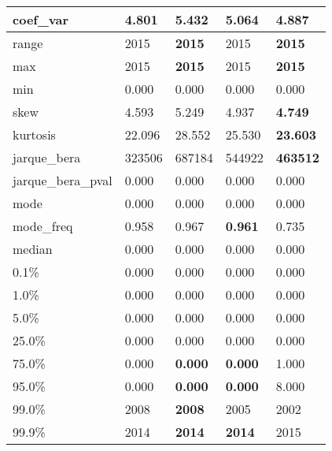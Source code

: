 \begin{table}[H]
\begin{tabular}{|l|m{10em}|m{10em}|m{10em}|m{10em}|}
\hline coef\_var & 4.801 & \cellcolor[rgb]{0.9, 0.54, 0.52} 5.432 & 5.064 & \bfseries 4.887 \\
\hline range & 2015 & \bfseries 2015 & \cellcolor[rgb]{0.9, 0.54, 0.52} 2015 & \bfseries 2015 \\
\hline max & 2015 & \bfseries 2015 & \cellcolor[rgb]{0.9, 0.54, 0.52} 2015 & \bfseries 2015 \\
\hline min & 0.000 & 0.000 & 0.000 & 0.000 \\
\hline skew & 4.593 & \cellcolor[rgb]{0.9, 0.54, 0.52} 5.249 & 4.937 & \bfseries 4.749 \\
\hline kurtosis & 22.096 & \cellcolor[rgb]{0.9, 0.54, 0.52} 28.552 & 25.530 & \bfseries 23.603 \\
\hline jarque\_bera & 323506 & \cellcolor[rgb]{0.9, 0.54, 0.52} 687184 & 544922 & \bfseries 463512 \\
\hline jarque\_bera\_pval & 0.000 & 0.000 & 0.000 & 0.000 \\
\hline mode & 0.000 & 0.000 & 0.000 & 0.000 \\
\hline mode\_freq & 0.958 & 0.967 & \bfseries 0.961 & \cellcolor[rgb]{0.9, 0.54, 0.52} 0.735 \\
\hline median & 0.000 & 0.000 & 0.000 & 0.000 \\
\hline 0.1\% & 0.000 & 0.000 & 0.000 & 0.000 \\
\hline 1.0\% & 0.000 & 0.000 & 0.000 & 0.000 \\
\hline 5.0\% & 0.000 & 0.000 & 0.000 & 0.000 \\
\hline 25.0\% & 0.000 & 0.000 & 0.000 & 0.000 \\
\hline 75.0\% & 0.000 & \bfseries 0.000 & \bfseries 0.000 & \cellcolor[rgb]{0.9, 0.54, 0.52} 1.000 \\
\hline 95.0\% & 0.000 & \bfseries 0.000 & \bfseries 0.000 & \cellcolor[rgb]{0.9, 0.54, 0.52} 8.000 \\
\hline 99.0\% & 2008 & \bfseries 2008 & 2005 & \cellcolor[rgb]{0.9, 0.54, 0.52} 2002 \\
\hline 99.9\% & 2014 & \bfseries 2014 & \bfseries 2014 & \cellcolor[rgb]{0.9, 0.54, 0.52} 2015 \\
\hline
\end{tabular}
\end{table}
